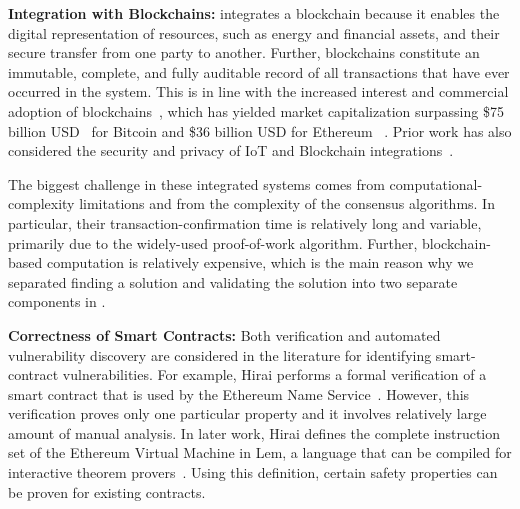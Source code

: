 \textbf{Integration with Blockchains:}
\Platform integrates a blockchain because it enables the digital representation of resources, such as energy and financial assets, and their secure transfer from one  party to another. Further, blockchains constitute an immutable, complete, and fully auditable record of all transactions that have ever occurred in the  system. This is in line with the increased interest and commercial adoption of blockchains~\cite{TheTruthAdoption:online}, which %
has yielded market capitalization surpassing \$75 billion USD~\cite{BitcoinPrices:online} for Bitcoin and \$36 billion USD for Ethereum ~\cite{EthereumPrices:online}. Prior work has also considered the security and privacy of IoT and Blockchain integrations~\cite{dorri2017blockchain,ouaddah2017towards,christidis2016blockchains}. 

The biggest challenge  in these integrated systems comes from computational-complexity limitations and from the complexity of the consensus algorithms. 
In particular, their transaction-confirmation time is relatively long and variable, primarily due to the widely-used proof-of-work algorithm. %
Further, blockchain-based  computation is relatively expensive, which is the main reason why we  separated finding a solution and validating the solution into two separate components in \Platform.




\textbf{Correctness of Smart Contracts:}
Both verification and automated vulnerability discovery are considered in the literature for identifying smart-contract vulnerabilities. 
For example, Hirai performs a formal verification of a smart contract that is used by the Ethereum Name Service~\cite{hirai2016formal}.
However, this verification proves only one particular property and it involves relatively large amount of manual analysis.
In later work, Hirai defines the complete instruction set of the Ethereum Virtual Machine in Lem, a language that can be compiled for interactive theorem provers~\cite{hirai2017defining}.
Using this definition, certain safety properties can be proven for existing contracts.


